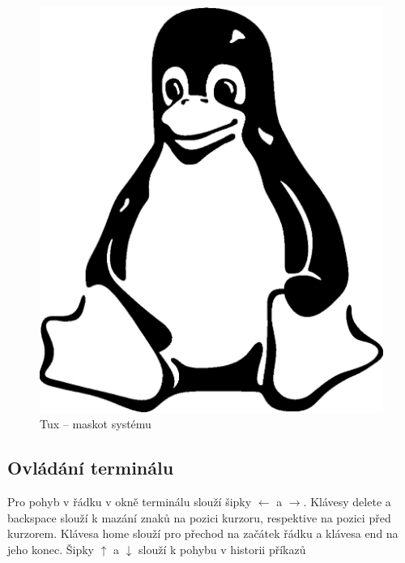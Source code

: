 \documentclass{article}
\begin{document}
\begin{figure}
\begin{center}
\includegraphics[scale=0.2]{tux.jpg}
\end{center}
\caption{Tux -- maskot systému}
\end{figure}

\subsection{Ovládání terminálu}
Pro pohyb v řádku v okně terminálu slouží šipky $\leftarrow$ a $\rightarrow$. Klávesy delete a backspace slouží k mazání znaků na pozici kurzoru, respektive na pozici před kurzorem. Klávesa home slouží pro přechod na začátek řádku a klávesa end na jeho konec. Šipky $\uparrow$ a $\downarrow$ slouží k pohybu v historii příkazů
\end{document}
